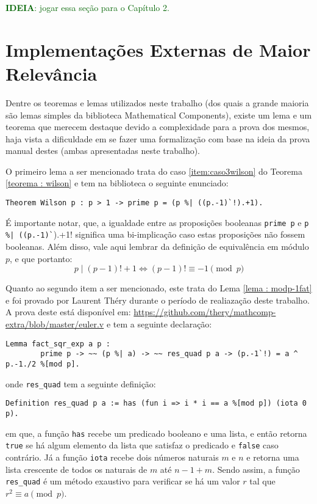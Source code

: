 \textcolor{darkgreen}{\textbf{IDEIA}: jogar essa seção para o Capítulo 2.}

\section{Implementações Externas de Maior Relevância}
Dentre os teoremas e lemas utilizados neste trabalho (dos quais a grande maioria são lemas simples da biblioteca Mathematical Components), existe um lema e um teorema que merecem destaque devido a complexidade para a prova dos mesmos, haja vista a dificuldade em se fazer uma formalização com base na ideia da prova manual destes (ambas apresentadas neste trabalho).

O primeiro lema a ser mencionado trata do caso \ref{item:caso3wilson} do Teorema \ref{teorema : wilson} e tem na biblioteca o seguinte enunciado:
\begin{lstlisting}[language=coq]
        Theorem Wilson p : p > 1 -> prime p = (p %| ((p.-1)`!).+1).
\end{lstlisting}
É importante notar, que, a igualdade entre as proposições booleanas \lstinline[language=coq]!prime p! e \lstinline[language=coq]!p %| ((p.-1)`!).+1! significa uma bi-implicação caso estas proposições não fossem booleanas. Além disso, vale aqui lembrar da definição de equivalência em módulo $p$, e que portanto:
\begin{equation}
        p \mid (p-1)! + 1 \Longleftrightarrow (p-1)! \equiv -1 \pmod{p} 
\end{equation}

Quanto ao segundo item a ser mencionado, este trata do Lema \ref{lema : modp-1fat} e foi provado por Laurent Théry durante o período de realiazação deste trabalho. A prova deste está disponível em: \hyperlink{https://github.com/thery/mathcomp-extra/blob/master/euler.v}{https://github.com/thery/mathcomp-extra/blob/master/euler.v} e tem a seguinte declaração:
\begin{lstlisting}[language=coq]
        Lemma fact_sqr_exp a p :
        prime p -> ~~ (p %| a) -> ~~ res_quad p a -> (p.-1`!) = a ^ p.-1./2 %[mod p].
\end{lstlisting}
onde \lstinline[language=coq]!res_quad! tem a seguinte definição:
\begin{lstlisting}[language=coq]
        Definition res_quad p a := has (fun i => i * i == a %[mod p]) (iota 0 p).
\end{lstlisting}
em que, a função \lstinline[language=coq]!has! recebe um predicado booleano e uma lista, e então retorna \lstinline[language=coq]!true!
se há algum elemento da lista que satisfaz o predicado e \lstinline[language=coq]!false! caso contrário. Já a função \lstinline[language=coq]!iota! recebe dois números naturais $m$ e $n$ e retorna uma lista crescente de todos os naturais de $m$ até $n-1+m$. Sendo assim, a função \lstinline[language=coq]!res_quad! é um método exaustivo para verificar se há um valor $r$ tal que $r^{2} \equiv a \pmod{p}$.

